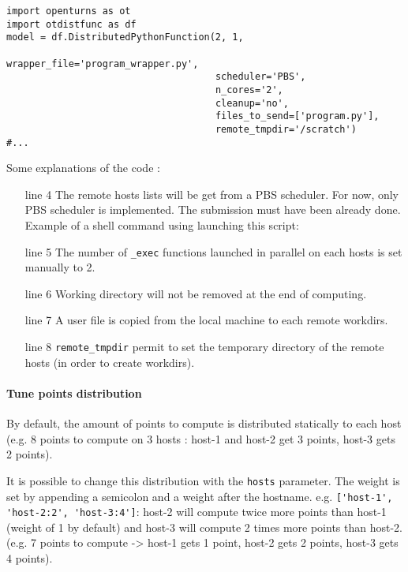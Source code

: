 \begin{lstlisting}
import openturns as ot
import otdistfunc as df
model = df.DistributedPythonFunction(2, 1, 
                                     wrapper_file='program_wrapper.py',
                                     scheduler='PBS',
                                     n_cores='2',
                                     cleanup='no',
                                     files_to_send=['program.py'],
                                     remote_tmpdir='/scratch')
#...
\end{lstlisting}

Some explanations of the code :
\begin{itemize}
  \item[line 4] The remote hosts lists will be get from a PBS scheduler. For now, only PBS scheduler is implemented. The submission must have been already done. Example of a shell command using launching this script:

  \item[line 5] The number of \verb|_exec| functions launched in parallel on each hosts is set manually to 2.
  \item[line 6] Working directory will not be removed at the end of computing.
  \item[line 7] A user file is copied from the local machine to each remote workdirs.
  \item[line 8] \verb|remote_tmpdir| permit to set the temporary directory of the remote hosts (in order to create workdirs). 
\end{itemize}

\paragraph{Tune points distribution} By default, the amount of points to compute is distributed statically to each host (e.g. 8 points to compute on 3 hosts : host-1 and host-2 get 3 points, host-3 gets 2 points). 

It is possible to change this distribution with the \verb|hosts| parameter. The weight is set by appending a semicolon and a weight after the hostname. e.g. \verb|['host-1', 'host-2:2', 'host-3:4']|: host-2 will compute twice more points than host-1 (weight of 1 by default) and host-3 will compute 2 times more points than host-2. (e.g. 7 points to compute -> host-1 gets 1 point, host-2 gets 2 points, host-3 gets 4 points). 

